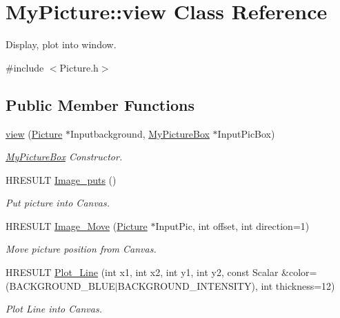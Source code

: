 \hypertarget{class_my_picture_1_1view}{}\section{My\+Picture\+:\+:view Class Reference}
\label{class_my_picture_1_1view}


Display, plot into window.  




{\ttfamily \#include $<$Picture.\+h$>$}

\subsection*{Public Member Functions}
\begin{DoxyCompactItemize}
\item 
\hyperlink{class_my_picture_1_1view_ad50c4a8c0a51930e7ddd9e4f78d8e897}{view} (\hyperlink{class_my_picture_1_1_picture}{Picture} $\ast$Inputbackground, \hyperlink{class_my_picture_1_1_my_picture_box}{My\+Picture\+Box} $\ast$Input\+Pic\+Box)
\begin{DoxyCompactList}\small\item\em \hyperlink{class_my_picture_1_1_my_picture_box}{My\+Picture\+Box} Constructor. \end{DoxyCompactList}\item 
H\+R\+E\+S\+U\+LT \hyperlink{class_my_picture_1_1view_ad01222e69e6bb7503487d29bfd8e51d1}{Image\+\_\+puts} ()
\begin{DoxyCompactList}\small\item\em Put picture into Canvas. \end{DoxyCompactList}\item 
H\+R\+E\+S\+U\+LT \hyperlink{class_my_picture_1_1view_ac7a95d5487774a020d48e6abe2af8df6}{Image\+\_\+\+Move} (\hyperlink{class_my_picture_1_1_picture}{Picture} $\ast$Input\+Pic, int offset, int direction=1)
\begin{DoxyCompactList}\small\item\em Move picture position from Canvas. \end{DoxyCompactList}\item 
H\+R\+E\+S\+U\+LT \hyperlink{class_my_picture_1_1view_a395603d388ba365f70494e9716553ffa}{Plot\+\_\+\+Line} (int x1, int x2, int y1, int y2, const Scalar \&color=(B\+A\+C\+K\+G\+R\+O\+U\+N\+D\+\_\+\+B\+L\+UE$\vert$B\+A\+C\+K\+G\+R\+O\+U\+N\+D\+\_\+\+I\+N\+T\+E\+N\+S\+I\+TY), int thickness=12)
\begin{DoxyCompactList}\small\item\em Plot Line into Canvas. \end{DoxyCompactList}\item 

\end{DoxyCompactItemize}
